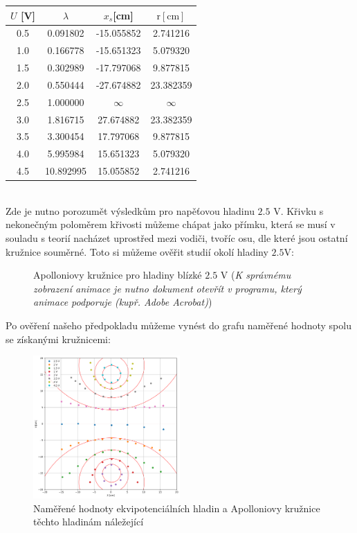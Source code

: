 \documentclass[czech,11pt,a4paper]{article}
\begin{document}
\begin{multicols}{2}
	\begin{tabular}{|c|c|c|c|}\hline
		$U$ [V] & $\lambda$ & $x_s$[cm] & $\mathrm{r}[\mathrm{cm}]$ \\\hline
		0.5 & 0.091802 & -15.055852 & 2.741216 \\ \hline
		1.0 & 0.166778 & -15.651323 & 5.079320 \\\hline
		1.5 & 0.302989 & -17.797068 & 9.877815 \\\hline
		2.0 & 0.550444 & -27.674882 & 23.382359 \\\hline
		2.5 & 1.000000 & $\infty$ & $\infty$ \\\hline
		3.0 & 1.816715 & 27.674882 & 23.382359 \\\hline
		3.5 & 3.300454 & 17.797068 & 9.877815 \\\hline
		4.0 & 5.995984 & 15.651323 & 5.079320 \\\hline
		4.5 & 10.892995 & 15.055852 & 2.741216 \\ \hline
	\end{tabular}
	\\
	Zde je nutno porozumět výsledkům pro napěťovou hladinu $2.5$ V. Křivku s nekonečným poloměrem křivosti můžeme chápat jako přímku, která se musí v souladu s teorií nacházet uprostřed mezi vodiči, tvoříc osu, dle které jsou ostatní kružnice souměrné. Toto si můžeme ověřit studií okolí hladiny $2.5$V:	
\begin{figure}[H]
		\begin{center}
			\caption{Apolloniovy kružnice pro hladiny blízké $2.5$ V (\textit{K správnému zobrazení animace je nutno dokument otevřít v programu, který animace podporuje (kupř. Adobe Acrobat)})}
	
		\end{center}
\end{figure}
\newpage
Po ověření našeho předpokladu můžeme vynést do grafu naměřené hodnoty spolu se získanými kružnicemi:
\begin{figure}[H]
	\begin{center}
		\includegraphics[max width=0.5\textwidth, center]{plot_high_res}
		\caption{Naměřené hodnoty ekvipotenciálních hladin a Apolloniovy kružnice těchto hladinám náležející}
		

\end{center}
\end{figure}
\end{multicols}
\end{document}
